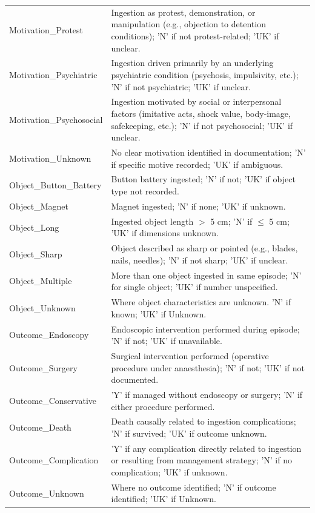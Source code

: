 \begin{table}[htbp]
\begin{tabular}{p{4.5cm} p{10.5cm}}
Motivation\_Protest & Ingestion as protest, demonstration, or manipulation (e.g., objection to detention conditions); 'N' if not protest-related; 'UK' if unclear. \\
Motivation\_Psychiatric & Ingestion driven primarily by an underlying psychiatric condition (psychosis, impulsivity, etc.); 'N' if not psychiatric; 'UK' if unclear. \\
Motivation\_Psychosocial & Ingestion motivated by social or interpersonal factors (imitative acts, shock value, body-image, safekeeping, etc.); 'N' if not psychosocial; 'UK' if unclear. \\
Motivation\_Unknown & No clear motivation identified in documentation; 'N' if specific motive recorded; 'UK' if ambiguous. \\
Object\_Button\_Battery & Button battery ingested; 'N' if not; 'UK' if object type not recorded. \\
Object\_Magnet & Magnet ingested; 'N' if none; 'UK' if unknown. \\
Object\_Long & Ingested object length $>$ 5 cm; 'N' if $\leq$ 5 cm; 'UK' if dimensions unknown. \\
Object\_Sharp & Object described as sharp or pointed (e.g., blades, nails, needles); 'N' if not sharp; 'UK' if unclear. \\
Object\_Multiple & More than one object ingested in same episode; 'N' for single object; 'UK' if number unspecified. \\
Object\_Unknown & Where object characteristics are unknown. 'N' if known; 'UK' if Unknown. \\
Outcome\_Endoscopy & Endoscopic intervention performed during episode; 'N' if not; 'UK' if unavailable. \\
Outcome\_Surgery & Surgical intervention performed (operative procedure under anaesthesia); 'N' if not; 'UK' if not documented. \\
Outcome\_Conservative & 'Y' if managed without endoscopy or surgery; 'N' if either procedure performed. \\
Outcome\_Death & Death causally related to ingestion complications; 'N' if survived; 'UK' if outcome unknown. \\
Outcome\_Complication & 'Y' if any complication directly related to ingestion or resulting from management strategy; 'N' if no complication; 'UK' if unknown. \\
Outcome\_Unknown & Where no outcome identified; 'N' if outcome identified; 'UK' if Unknown. \\
\bottomrule
\end{tabular}
\end{table}

